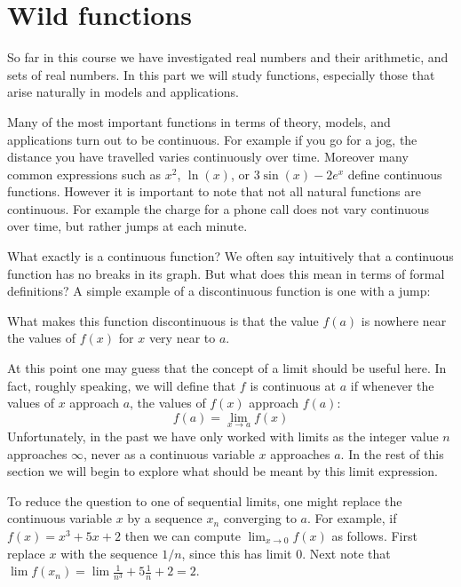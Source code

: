 \documentclass[11pt,oneside]{amsbook}
\theoremstyle{definition}
\theoremstyle{plain}
\theoremstyle{definition}
\theoremstyle{remark}
\numberwithin{equation}{section}
\numberwithin{figure}{section}
\begin{document}
\section{Wild functions}


So far in this course we have investigated real numbers and their arithmetic, and sets of real numbers. In this part we will study functions, especially those that arise naturally in models and applications.

Many of the most important functions in terms of theory, models, and applications turn out to be continuous. For example if you go for a jog, the distance you have travelled varies continuously over time. Moreover many common expressions such as $x^2$, $\ln(x)$, or $3\sin(x)-2e^x$ define continuous functions. However it is important to note that not all natural functions are continuous. For example the charge for a phone call does not vary continuous over time, but rather jumps at each minute.

What exactly is a continuous function? We often say intuitively that a continuous function has no breaks in its graph. But what does this mean in terms of formal definitions? A simple example of a discontinuous function is one with a jump:
\begin{center}
\end{center}
What makes this function discontinuous is that the value $f(a)$ is nowhere near the values of $f(x)$ for $x$ very near to $a$.

At this point one may guess that the concept of a limit should be useful here. In fact, roughly speaking, we will define that $f$ is continuous at $a$ if whenever the values of $x$ approach $a$, the values of $f(x)$ approach $f(a)$:
\[f(a)=\lim_{x\to a}f(x)
\]
Unfortunately, in the past we have only worked with limits as the integer value $n$ approaches $\infty$, never as a continuous variable $x$ approaches $a$. In the rest of this section we will begin to explore what should be meant by this limit expression.

To reduce the question to one of sequential limits, one might replace the continuous variable $x$ by a sequence $x_n$ converging to $a$. For example, if $f(x)=x^3+5x+2$ then we can compute $\lim_{x\to0}f(x)$ as follows. First replace $x$ with the sequence $1/n$, since this has limit $0$. Next note that $\lim f(x_n)=\lim \frac{1}{n^3}+5\frac{1}{n}+2=2$.
\end{document}
